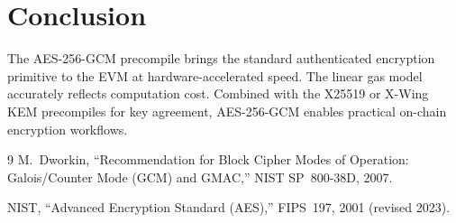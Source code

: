 \documentclass[11pt,a4paper]{article}
\begin{document}
\section{Conclusion}

The AES-256-GCM precompile brings the standard authenticated encryption primitive
to the EVM at hardware-accelerated speed. The linear gas model accurately reflects
computation cost. Combined with the X25519 or X-Wing KEM precompiles for key
agreement, AES-256-GCM enables practical on-chain encryption workflows.

\begin{thebibliography}{9}
  M.~Dworkin, ``Recommendation for Block Cipher Modes of Operation:
  Galois/Counter Mode (GCM) and GMAC,'' NIST SP~800-38D, 2007.

  NIST, ``Advanced Encryption Standard (AES),'' FIPS~197, 2001 (revised 2023).
\end{thebibliography}
\end{document}
